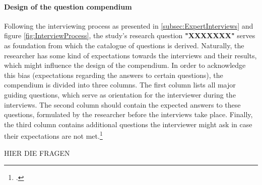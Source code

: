 \paragraph{Design of the question compendium} Following the interviewing process as presented in \ref{subsec:ExpertInterviews} and figure \ref{fig:InterviewProcess}, the study's research question \textbf{"XXXXXXX"} serves as foundation from which the catalogue of questions is derived. Naturally, the researcher has some kind of expectations towards the interviews and their results, which might influence the design of the compendium. In order to acknowledge this bias (expectations regarding the answers to certain questions), the compendium is divided into three columns. The first column lists all major guiding questions, which serve as orientation for the interviewer during the interviews. The second column should contain the expected answers to these questions, formulated by the researcher before the interviews take place. Finally, the third column contains additional questions the interviewer might ask in case their expectations are not met.\footcite[Cf.][p.431]{AghamanoukjanQualitativeInterviews2007}

HIER DIE FRAGEN


